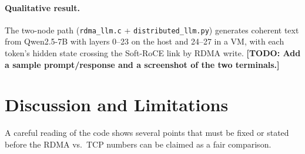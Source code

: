 \documentclass[11pt,a4paper]{article}
\newcommand{\TODO}[1]{\textcolor{todo}{\textbf{[TODO: #1]}}}
\begin{document}
\paragraph{Qualitative result.} The two-node path (\texttt{rdma\_llm.c} + \texttt{distributed\_llm.py}) generates coherent text from Qwen2.5-7B with layers 0--23 on the host and 24--27 in a VM, with each token's hidden state crossing the Soft-RoCE link by RDMA write. \TODO{Add a sample prompt/response and a screenshot of the two terminals.}

\section{Discussion and Limitations}
\label{sec:limits}
A careful reading of the code shows several points that must be fixed or stated before the RDMA vs.\ TCP numbers can be claimed as a fair comparison.
\end{document}
